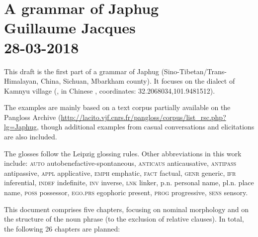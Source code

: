 \chapter*{A grammar of Japhug\\
Guillaume Jacques\\
28-03-2018}  
\sloppy
This draft is the first part of a grammar of Japhug (Sino-Tibetan/Trans-Himalayan, China, Sichuan, Mbarkham county). It focuses on the dialect of Kamnyu village (, in Chinese , coordinates: 32.2068034,101.9481512).

The examples are mainly based on a text corpus partially available on the Pangloss Archive (\url{http://lacito.vjf.cnrs.fr/pangloss/corpus/list\_rsc.php?lg=Japhug}, though additional examples from casual conversations and elicitations are also included.

The glosses follow the Leipzig glossing rules. Other abbreviations in this work include: \textsc{auto}  autobenefactive-spontaneous, \textsc{anticaus} anticausative, \textsc{antipass} antipassive, \textsc{appl} applicative, \textsc{emph} emphatic, \textsc{fact} factual, \textsc{genr} generic, \textsc{ifr} inferential, \textsc{indef} indefinite, \textsc{inv} inverse,  \textsc{lnk} linker, p.n. personal name, pl.n. place name, \textsc{poss} possessor, \textsc{ego.prs} egophoric present, \textsc{prog} progressive, \textsc{sens} sensory. 

This document comprises five chapters, focusing on nominal morphology and on the structure of the noun phrase (to the exclusion of relative clauses). In total, the following 26 chapters are planned:

